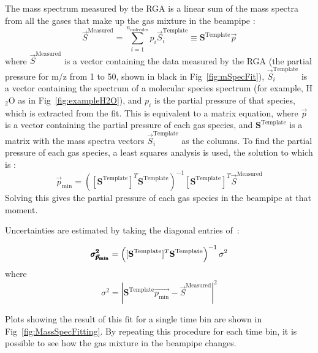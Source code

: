 The mass spectrum measured by the RGA is a linear sum of the mass spectra from all the gases that make up the gas mixture in the beampipe \cite{MassSpecBook}:
\begin{equation}
	{\vec{S}^{\mathrm{Measured}} = \sum_{i=1}^{n_{\mathrm{molecules}}}p_{i}\vec{S}^{\mathrm{Template}}_{i} \equiv \textbf{S}^{\mathrm{Template}}\vec{p}}
\end{equation}
where $\vec{S}^{\mathrm{Measured}}$ is a vector containing the data measured by the RGA (the partial pressure for m/z from 1 to 50, shown in black in Fig~\ref{fig:mSpecFit}), $\vec{S}_{i}^{\mathrm{Template}}$ is a vector containing the spectrum of a molecular species spectrum (for example, H$_2$O as in Fig~\ref{fig:exampleH2O}), and $p_{i}$ is the partial pressure of that species, which is extracted from the fit. This is equivalent to a matrix equation, where $\vec{p}$ is a vector containing the partial pressure of each gas species, and $\textbf{S}^{\mathrm{Template}}$ is a matrix with the mass spectra vectors $\vec{S}_{i}^{\mathrm{Template}}$ as the columns. To find the partial pressure of each gas species, a least squares analysis is used, the solution to which is \cite{LinAlg}:
\begin{equation}
	{\vec{p}_{\mathrm{min}}=\left ( [\textbf{S}^{\mathrm{Template}}]^{T}\textbf{S}^{\mathrm{Template}} \right )^{-1}[\textbf{S}^{\mathrm{Template}}]^{T}\vec{S}^{\mathrm{Measured}}}
	\label{eqn:LSQ}
\end{equation}
Solving this gives the partial pressure of each gas species in the beampipe at that moment. 



Uncertainties are estimated by taking the diagonal entries of~\cite{LinAlg2}:

\begin{equation}
		{\pmb{\sigma_{\vec{p}_{\mathrm{min}}}^{2}}=\left( [\textbf{S}^{\mathrm{Template}}]^{T}\textbf{S}^{\mathrm{Template}} \right )^{-1}\sigma^{2}}\\
\label{eqn:FitUncer}
\end{equation}
where 
\begin{equation}
		{\sigma^2=|\textbf{S}^{\mathrm{Template}}\vec{p_{\mathrm{min}}}-\vec{S}^{\mathrm{Measured}}|^2}
\end{equation}


Plots showing the result of this fit for a single time bin are shown in Fig~\ref{fig:MassSpecFitting}. By repeating this procedure for each time bin, it is possible to see how the gas mixture in the beampipe changes.

